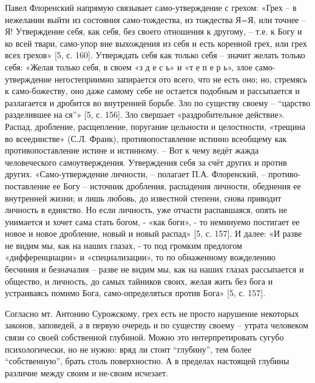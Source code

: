 Павел Флоренский напрямую связывает само-утверждение с грехом: «Грех – в
нежелании выйти из состояния само-тождества, из тождества Я=Я, или точнее – Я!
Утверждение себя, как себя, без своего отношения к другому, – т.е. к Богу и ко
всей твари, само-упор вне выхождения из себя и есть коренной грех, или грех
всех грехов» [5, с. 160]. Утверждать себя как только себя – значит желать
только себя: «Желая только себя, в своем «з д е с ь» и «т е п е р ь», злое
само-утверждение негостеприимно запирается ото всего, что не есть оно; но,
стремясь к само-божеству, оно даже самому себе не остается подобным и
рассыпается и разлагается и дробится во внутренней борьбе. Зло по существу
своему – “царство разделившее на ся”» [5, с. 156]. Зло свершает
«раздробительное действие». Распад, дробление, расщепление, поругание цельности
и целостности, «трещина во всеединстве» (С.Л. Франк), противопоставление
истинно всеобщему как противопоставление истине и истинному. – Вот к чему ведёт
жажда человеческого самоутверждения. Утверждения себя за счёт других и против
других. «Само-утверждение личности, – полагает П.А. Флоренский, –
противо-поставление ее Богу – источник дробления, распадения личности,
обеднения ее внутренней жизни; и лишь любовь, до известной степени, снова
приводит личность в единство. Но если личность, уже отчасти распавшаяся, опять
не унимается и хочет сама стать богом, - «как боги», - то неминуемо постигает
ее новое и новое дробление, новый и новый распад» [5, с. 157]. И далее: «И
разве не видим мы, как на наших глазах, - то под громким предлогом
«дифференциации» и «специализации», то по обнаженному вожделению бесчиния и
безначалия – разве не видим мы, как на наших глазах рассыпается и общество, и
личность, до самых тайников своих, желая жить без бога и устраиваясь помимо
Бога, само-определяться против Бога» [5, с. 157].

Согласно мт. Антонию Сурожскому, грех есть не просто нарушение некоторых
законов, заповедей, а в первую очередь и по существу своему – утрата человеком
связи со своей собственной глубиной. Можно это интерпретировать сугубо
психологически, но не нужно: вряд ли стоит “глубину”, тем более “собственную”,
брать столь поверхностно. А в пределах настоящей глубины различие между своим и
не-своим исчезает.

